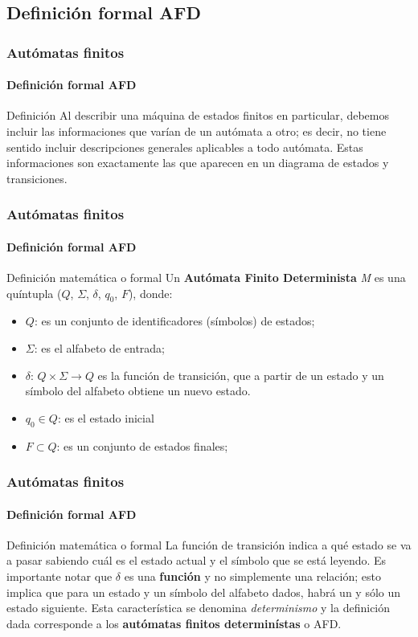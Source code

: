 \documentclass{beamer}
\begin{document}
        \subsection{Definici\'on formal AFD}

        \begin{frame}
			\frametitle{Aut\'omatas finitos}
			\framesubtitle{Definici\'on formal AFD}

            \begin{block}{Definici\'on}
                Al describir una m\'aquina de estados finitos en particular, debemos incluir las informaciones que var\'ian de un aut\'omata a otro; es decir, no tiene sentido incluir descripciones generales aplicables a todo aut\'omata. Estas informaciones son exactamente las que aparecen en un diagrama de estados y transiciones.
            \end{block}
		\end{frame}

        \begin{frame}
			\frametitle{Aut\'omatas finitos}
			\framesubtitle{Definici\'on formal AFD}

            \begin{block}{Definici\'on matem\'atica o formal}
                 Un \textbf{Aut\'omata Finito Determinista} \emph{M} es una qu\'intupla ($Q$, $\Sigma$, $\delta$, $q_{0}$, $F$), donde:
                \begin{itemize}
                    \item[] $Q$: es un conjunto de identificadores (s\'imbolos) de estados;
                    \item[] $\Sigma$: es el alfabeto de entrada;
                    \item[] $\delta$: $Q \times \Sigma \rightarrow Q$ es la funci\'on de transici\'on, que a partir de un estado y un s\'imbolo del alfabeto obtiene un nuevo estado.
                    \item[] $q_{0} \in Q$: es el estado inicial
                    \item[] $F \subset Q$: es un conjunto de estados finales;
                \end{itemize}
            \end{block}
		\end{frame}

        \begin{frame}
			\frametitle{Aut\'omatas finitos}
			\framesubtitle{Definici\'on formal AFD}

            \begin{block}{Definici\'on matem\'atica o formal}
               La funci\'on de transici\'on indica a qu\'e estado se va a pasar sabiendo cu\'al es el estado actual y el s\'imbolo que se est\'a leyendo. Es importante notar que $\delta$ es una \textbf{funci\'on} y no simplemente una relaci\'on; esto implica que para un estado y un s\'imbolo del alfabeto dados, habr\'a un y s\'olo un estado siguiente. Esta caracter\'istica se denomina \emph{determinismo} y la definici\'on dada corresponde a los \textbf{aut\'omatas finitos determin\'istas} o AFD.
            \end{block}
		\end{frame}
\end{document}
